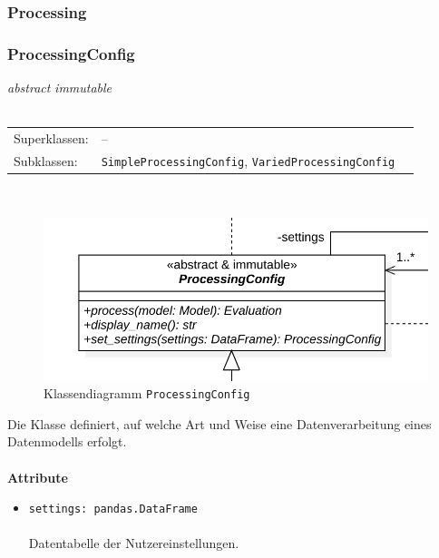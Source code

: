 \documentclass{article}
\begin{document}
\newpage
\subsubsection{Processing}

\subsubsection*{\large{\textbf{ProcessingConfig}\label{cls:ProcessingConfig}}}
\textit{\flqq{}abstract\frqq} \textit{\flqq{}immutable\frqq}\normalsize\\\\
\begin{tabular}{lll}
 Superklassen: & --\\
 Subklassen: & \texttt{SimpleProcessingConfig}, \texttt{VariedProcessingConfig}
\end{tabular}\\
\begin{figure}[H]%
    \centering
    \includegraphics[width=13cm]{entwurf/Entwurf_dokument/img/cls/model/ProcessingConfig.png}
    \caption{Klassendiagramm \texttt{ProcessingConfig}}
\end{figure}

Die Klasse definiert, auf welche Art und Weise eine Datenverarbeitung eines Datenmodells erfolgt.
\\\\

\textbf{Attribute}
\begin{itemize}\setlength\itemsep{3em}
\item \texttt{settings: pandas.DataFrame}\\\\
Datentabelle der Nutzereinstellungen.
\\\\
\end{itemize}
\end{document}
